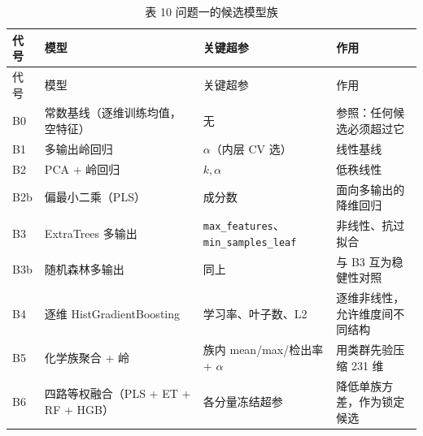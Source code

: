 \documentclass[
  a4paper,12pt]{article}
\begin{document}
\begin{longtable}[]{@{}
  >{\raggedright\arraybackslash}p{}
  >{\raggedright\arraybackslash}p{}
  >{\raggedright\arraybackslash}p{}
  >{\raggedright\arraybackslash}p{}@{}}
\caption{表 10 问题一的候选模型族}\tabularnewline
\toprule\noalign{}
\begin{minipage}[b]{\linewidth}\raggedright
代号
\end{minipage} & \begin{minipage}[b]{\linewidth}\raggedright
模型
\end{minipage} & \begin{minipage}[b]{\linewidth}\raggedright
关键超参
\end{minipage} & \begin{minipage}[b]{\linewidth}\raggedright
作用
\end{minipage} \\
\midrule\noalign{}
\endfirsthead
\toprule\noalign{}
\begin{minipage}[b]{\linewidth}\raggedright
代号
\end{minipage} & \begin{minipage}[b]{\linewidth}\raggedright
模型
\end{minipage} & \begin{minipage}[b]{\linewidth}\raggedright
关键超参
\end{minipage} & \begin{minipage}[b]{\linewidth}\raggedright
作用
\end{minipage} \\
\midrule\noalign{}
\endhead
\bottomrule\noalign{}
\endlastfoot
B0 & 常数基线（逐维训练均值，空特征） & 无 & 参照：任何候选必须超过它 \\
B1 & 多输出岭回归 & \(\alpha\)（内层 CV 选） & 线性基线 \\
B2 & PCA + 岭回归 & \(k,\alpha\) & 低秩线性 \\
B2b & 偏最小二乘（PLS） & 成分数 & 面向多输出的降维回归 \\
B3 & ExtraTrees 多输出 &
\texttt{max\_features}、\texttt{min\_samples\_leaf} &
非线性、抗过拟合 \\
B3b & 随机森林多输出 & 同上 & 与 B3 互为稳健性对照 \\
B4 & 逐维 HistGradientBoosting & 学习率、叶子数、L2 &
逐维非线性，允许维度间不同结构 \\
B5 & 化学族聚合 + 岭 & 族内 mean/max/检出率 + \(\alpha\) &
用类群先验压缩 231 维 \\
B6 & 四路等权融合（PLS + ET + RF + HGB） & 各分量冻结超参 &
降低单族方差，作为锁定候选 \\
\end{longtable}
\end{document}
